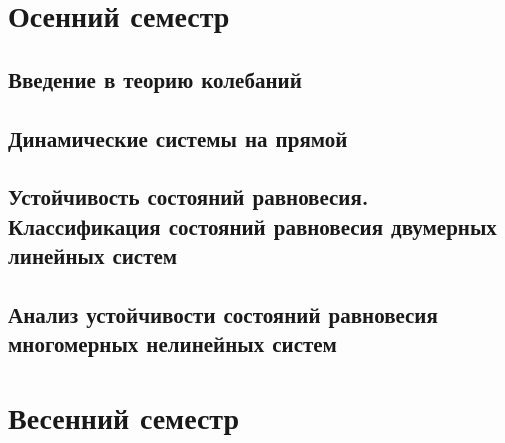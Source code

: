 \documentclass[14pt,a4paper]{extreport}
\theoremstyle{definition}
\begin{document}


\newpage
\tableofcontents 
\newpage
\part{Осенний семестр}
\chapter{Введение в теорию колебаний}
\label{sec:lect1}
	


\newpage
\chapter{Динамические системы на прямой}
\label{sec:lect2}
	

\newpage
\chapter{Устойчивость состояний равновесия. Классификация состояний равновесия двумерных линейных
систем}
\label{sec:lect3}
	

\newpage
\chapter{Анализ устойчивости состояний равновесия многомерных нелинейных систем}
\label{sec:lect4}
	
        





\part{Весенний семестр}
% 	
\end{document}

